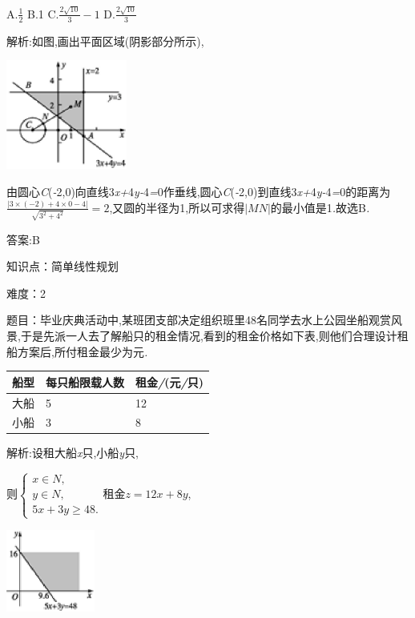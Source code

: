 \documentclass{article} %
\begin{document}
 A.$\frac{1}{2}$ B.1 C.$\frac{2\sqrt{10}}{3}-1$ D.$\frac{2\sqrt{10}}{3}$

 解析:如图,画出平面区域(阴影部分所示),

 \includegraphics*[width=1.56in, height=1.42in, keepaspectratio=false]{image1750}

由圆心\textit{C}(\textit{-}2,0)向直线3\textit{x+}4\textit{y-}4\textit{=}0作垂线,圆心\textit{C}(\textit{-}2,0)到直线3\textit{x+}4\textit{y-}4\textit{=}0的距离为$\frac{|3\times(-2)+4\times0-4|}{\sqrt{3^2+4^2}}=2$,又圆的半径为1,所以可求得$|MN|$的最小值是1\textit{.}故选B\textit{.}

 答案:B


知识点：简单线性规划

难度：2

题目：毕业庆典活动中,某班团支部决定组织班里48名同学去水上公园坐船观赏风景,于是先派一人去了解船只的租金情况,看到的租金价格如下表,则他们合理设计租船方案后,所付租金最少为\textit{\underbar{　　　　　}}元\textit{.~}

\begin{tabular}{|p{0.4in}|p{1.5in}|p{1.3in}|} \hline 
	船型 & 每只船限载人数 & 租金\textit{/}(元\textit{/}只) \\ \hline 
	大船 & 5 & 12 \\ \hline 
	小船 & 3 & 8 \\ \hline 
\end{tabular}



 解析:设租大船\textit{x}只,小船\textit{y}只,

则$
\begin{cases}
x\in N,\\
y \in N,\\
5x+3y \ge 48.
\end{cases}$租金$z=12x+8y$,

 \includegraphics*[width=1.15in, height=1.07in, keepaspectratio=false]{image1753}
\end{document}
